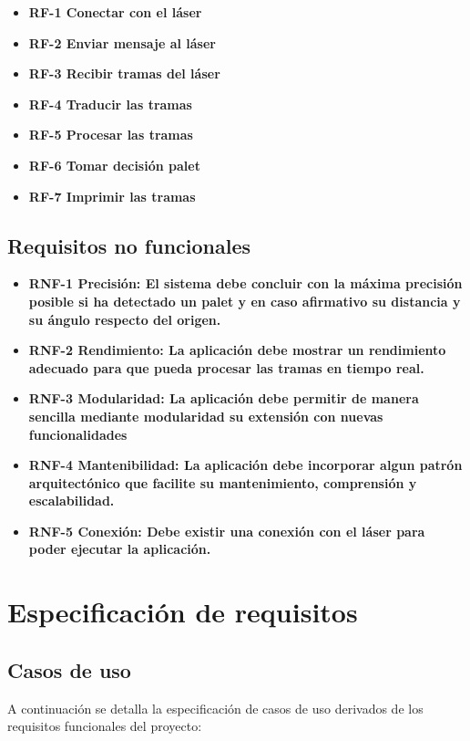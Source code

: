 \begin{itemize}
	\item \textbf{RF-1 Conectar con el láser}
	\item \textbf{RF-2 Enviar mensaje al láser}
	\item \textbf{RF-3 Recibir tramas del láser}
	\item \textbf{RF-4 Traducir las tramas }
	\item \textbf{RF-5 Procesar las tramas}
	\item \textbf{RF-6 Tomar decisión palet}
	\item \textbf{RF-7 Imprimir las tramas}
		
\end{itemize}

\subsection{Requisitos no funcionales}
\begin{itemize}
	\item \textbf{RNF-1 Precisión: El sistema debe concluir con la máxima precisión posible si ha detectado un palet y en caso afirmativo su distancia y su ángulo respecto del origen.}
	\item \textbf{RNF-2 Rendimiento: La aplicación debe mostrar un rendimiento adecuado para que pueda procesar las tramas en tiempo real.}
	\item \textbf{RNF-3 Modularidad: La aplicación debe permitir de manera sencilla mediante modularidad su extensión con nuevas funcionalidades}
	\item \textbf{RNF-4 Mantenibilidad: La aplicación debe incorporar algun patrón arquitectónico que facilite su mantenimiento, comprensión y escalabilidad.}
	\item \textbf{RNF-5 Conexión: Debe existir una conexión con el láser para poder ejecutar la aplicación.}
\end{itemize}

\section{Especificación de requisitos}
\subsection{Casos de uso}
A continuación se detalla la especificación de casos de uso derivados de los requisitos funcionales del proyecto:\\

